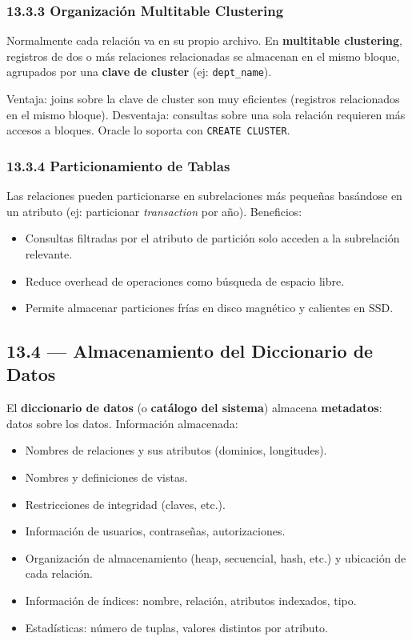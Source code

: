 \documentclass[11pt, a4paper]{article}
\begin{document}
\subsubsection{13.3.3 Organización Multitable Clustering}

Normalmente cada relación va en su propio archivo. En \textbf{multitable clustering}, registros de dos o más relaciones relacionadas se almacenan en el mismo bloque, agrupados por una \textbf{clave de cluster} (ej: \texttt{dept\_name}).

Ventaja: joins sobre la clave de cluster son muy eficientes (registros relacionados en el mismo bloque). Desventaja: consultas sobre una sola relación requieren más accesos a bloques. Oracle lo soporta con \texttt{CREATE CLUSTER}.

\subsubsection{13.3.4 Particionamiento de Tablas}

Las relaciones pueden particionarse en subrelaciones más pequeñas basándose en un atributo (ej: particionar \textit{transaction} por año). Beneficios:
\begin{itemize}[nosep]
	\item Consultas filtradas por el atributo de partición solo acceden a la subrelación relevante.
	\item Reduce overhead de operaciones como búsqueda de espacio libre.
	\item Permite almacenar particiones frías en disco magnético y calientes en SSD.
\end{itemize}

\subsection{13.4 --- Almacenamiento del Diccionario de Datos}

El \textbf{diccionario de datos} (o \textbf{catálogo del sistema}) almacena \textbf{metadatos}: datos sobre los datos. Información almacenada:
\begin{itemize}[nosep]
	\item Nombres de relaciones y sus atributos (dominios, longitudes).
	\item Nombres y definiciones de vistas.
	\item Restricciones de integridad (claves, etc.).
	\item Información de usuarios, contraseñas, autorizaciones.
	\item Organización de almacenamiento (heap, secuencial, hash, etc.) y ubicación de cada relación.
	\item Información de índices: nombre, relación, atributos indexados, tipo.
	\item Estadísticas: número de tuplas, valores distintos por atributo.
\end{itemize}
\end{document}
